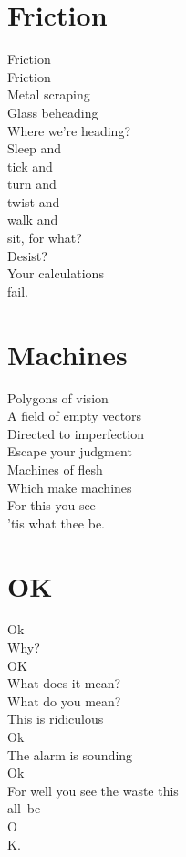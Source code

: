 \documentclass[a4paper,twoside, openany]{book}
\newenvironment{Verse}
  {\center\varwidth{\linewidth}\fontsize{18}{21.6}\selectfont}
  {\endvarwidth\endcenter}
\begin{document}
\chapter{Friction}
\begin{Verse}
    Friction\\
    Friction\\
    Metal scraping\\
    Glass beheading\\
    Where we’re heading?\\
    Sleep and\\
    tick and\\
    turn and\\
    twist and \\
    walk and\\
    sit, for what?\\
    Desist?\\
    Your calculations\\
    fail.
\end{Verse}


\chapter{Machines}
\begin{Verse}
    Polygons of vision\\
    A field of empty vectors\\
    Directed to imperfection\\
    Escape your judgment\\
    Machines of flesh\\
    Which make machines\\
    For this you see\\
    'tis what thee be.
\end{Verse}


\chapter{OK}
\begin{Verse}
    Ok\\
    Why?\\
    OK\\
    What does it mean?\\
    What do you mean?\\
    This is ridiculous\\
    Ok\\
    The alarm is sounding\\
    Ok\\
    For well you see the waste this\\
    all\
    be\\
    O\\
    K.
\end{Verse}
\end{document}
